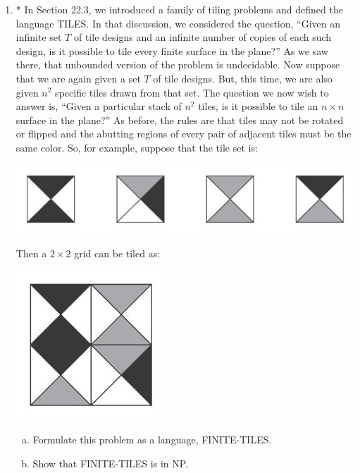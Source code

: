 \documentclass[10pt]{article}
\begin{document}
\begin{enumerate}[1)]
\item
* In Section 22.3, we introduced a family of tiling problems and defined the language TILES.  In that discussion, we considered the question, “Given an infinite set $T$ of tile designs and an infinite number of copies of each such design, is it possible to tile every finite surface in the plane?”  As we saw there, that unbounded version of the problem is undecidable.  Now suppose that we are again given a set $T$ of tile designs.  But, this time, we are also given $n^2$ specific tiles drawn from that set.  The question we now wish to answer is, “Given a particular stack of $n^2$ tiles, is it possible to tile an $n \times n$ surface in the plane?”  As before, the rules are that tiles may not be rotated or flipped and the abutting regions of every pair of adjacent tiles must be the same color.  So, for example, suppose that the tile set is:\\
\begin{center}
\includegraphics[scale=.5]{images/tileset.jpg}
\end{center}
Then a $2 \times 2$ grid can be tiled as:\\
\begin{center}
\includegraphics[scale=.5]{images/tiling.jpg}
\end{center}
\begin{enumerate}[a)]
\item
Formulate this problem as a language, FINITE-TILES.
\item
Show that FINITE-TILES is in NP.
\end{enumerate}
\end{enumerate}
\end{document}
